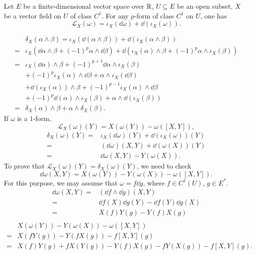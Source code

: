 \begin{theoremenv}
    Let $E$ be a finite-dimensional vector space over $\mathbb{R}$, $U \subseteq E$ be an open subset,
    $X$ be a vector field on $U$ of class $C^1$.
    For any $p$-form of class $C^1$ on $U$, one has
    $$\mathcal{L}_{X}(\omega) = \iota_{X}(\dd \omega) + \dd (\iota_{X} (\omega)).$$
\end{theoremenv}
\begin{proofenv}
    $$\begin{aligned}
        & \delta_{X}(\alpha \wedge \beta) = \iota_{X}(\dd (\alpha \wedge \beta)) + \dd (\iota_{X}(\alpha \wedge \beta))\\
        = & \iota_{X}(\dd \alpha \wedge \beta + (-1)^{p} \alpha \wedge \dd \beta) + \dd \left(\iota_{X}(\alpha) \wedge \beta + (-1)^{p}\alpha \wedge \iota_{X}(\beta)\right)\\
        = & \iota_{X}(\dd \alpha) \wedge \beta + (-1)^{p+1} \dd \alpha \wedge \iota_{X}(\beta)\\
        & + (-1)^{p}\iota_{X}(\alpha) \wedge \dd \beta + \alpha \wedge \iota_{X}(\dd \beta)\\
        & + \dd (\iota_{X}(\alpha)) \wedge \beta + (-1)^{p-1} \iota_{X}(\alpha) \wedge \dd \beta\\
        & + (-1)^{p} \dd (\alpha) \wedge \iota_{X}(\beta) + \alpha \wedge \dd (\iota_{X}(\beta))\\
        = & \delta_{X}(\alpha) \wedge \beta + \alpha \wedge \delta_{X}(\beta).
    \end{aligned}$$
    If $\omega$ is a $1$-form, 
    $$\mathcal{L}_{X}(\omega)(Y) = X(\omega(Y)) - \omega([X,Y]),$$
    $$\begin{aligned}
        \delta_{X}(\omega)(Y)
        = & \iota_{X} (\dd \omega) (Y) + \dd (\iota_{X}(\omega))(Y)\\
        = & (\dd \omega)(X,Y) + \dd(\omega(X))(Y)\\
        = & \dd \omega (X,Y) - Y (\omega(X)).
    \end{aligned}$$
    To prove that $\mathcal{L}_{X}(\omega)(Y) = \delta_{X}(\omega)(Y)$, we need to check
    $$\dd \omega (X,Y) = X (\omega(Y)) - Y (\omega(X)) - \omega([X,Y]).$$
    For this purpose, we may assume that $\omega = f \dd g$, where $f \in C^{1}(U)$, $g \in E^*$.
    $$\begin{aligned}
        \dd \omega (X,Y) = & (\dd f \wedge \dd g)(X,Y)\\
        = & \dd f (X) \dd g (Y) - \dd f (Y) \dd g (X)\\
        = & X(f) Y(g) - Y(f) X(g)\\
    \end{aligned}$$
    $$\begin{aligned}
        & X(\omega(Y)) - Y(\omega(X)) - \omega([X,Y])\\
        = & X(f Y(g)) - Y(f X(g)) - f [X,Y](g)\\
        = & X(f) Y(g) + f X(Y(g)) - Y(f) X(g) - f Y(X(g)) - f [X,Y](g).
    \end{aligned}$$
\end{proofenv}

